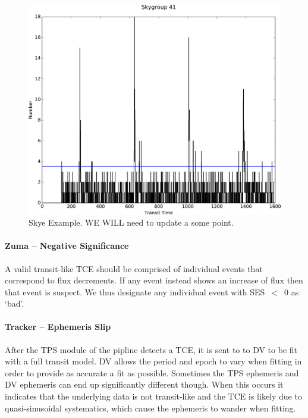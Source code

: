 \begin{figure}[h]
\centering
\includegraphics[width=\linewidth]{Skye-Paper-Plot.png}
\caption{Skye Example. WE WILL need to update a some point.}
\label{skyefig}
\end{figure}


\paragraph{Zuma -- Negative Significance}
\label{s:zuma}

A valid transit-like TCE should be comprised of individual events that correspond to flux decrements. If any event instead shows an increase of flux then that event is suspect. We thus designate any individual event with SES~$<$~0 as `bad'.


\paragraph{Tracker -- Ephemeris Slip}
\label{s:tracker}
After the TPS module of the \kepler{} pipline detects a TCE, it is sent to to DV to be fit with a full transit model. DV allows the period and epoch to vary when fitting in order to provide as accurate a fit as possible. Sometimes the TPS ephemeris and DV ephemeris can end up significantly different though. When this occurs it indicates that the underlying data is not transit-like and the TCE is likely due to quasi-sinusoidal systematics, which cause the ephemeris to wander when fitting.

